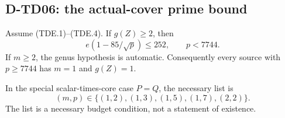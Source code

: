 \subsection{D-TD06: the actual-cover prime bound}

\begin{theorem}[D-TD06]
Assume (TDE.1)--(TDE.4).  If $g(Z)\ge2$, then
\[
                 e(1-85/\sqrt p)\le252,
                 \qquad p<7744.
                 \tag{TDE.11}
\]
If $m\ge2$, the genus hypothesis is automatic.  Consequently every
source with $p\ge7744$ has $m=1$ and $g(Z)=1$.

In the special scalar-times-core case $P=Q$, the necessary list is
\[
             (m,p)\in\{(1,2),(1,3),(1,5),(1,7),(2,2)\}.
             \tag{TDE.12}
\]
The list is a necessary budget condition, not a statement of existence.
\end{theorem}

